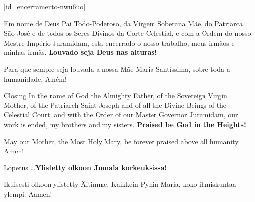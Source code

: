   [id={encerramento-nwu6uo}]\begin{passage}[PT]{}\vspace{-1ex}%
    Em nome de Deus Pai Todo-Poderoso, da Virgem
    Soberana Mãe, do Patriarca São José e de todos
    os Seres Divinos da Corte Celestial, e com
    a Ordem do nosso Mestre Império Juramidam,
    está encerrado o nosso trabalho, meus irmãos
    e minhas irmãs.
    \textbf{Louvado seja Deus nas alturas!}
    \par
    Para que sempre seja louvada a nossa Mãe Maria
    Santíssima, sobre toda a humanidade. Amém!
  \end{passage}
  \begin{passage}[EN]{Closing}
    In the name of God the Almighty Father, of the Sovereign
    Virgin Mother, of the Patriarch Saint Joseph and of all
    the Divine Beings of the Celestial Court, and with
    the Order of our Master Governor Juramidam,
    our work is ended, my brothers and my sisters.
    \textbf{Praised be God in the Heights!}
    \par
    May our Mother, the Most Holy Mary, be forever
    praised above all humanity. Amen!
  \end{passage}
  \begin{passage}[FI]{Lopetus}
    \ldots\textbf{Ylistetty olkoon Jumala korkeuksissa!}
    \par
    Ikuisesti olkoon ylistetty Äitimme, Kaikkein Pyhin Maria,
    koko ihmiskuntaa ylempi. Aamen!
  \end{passage}
\endsong



